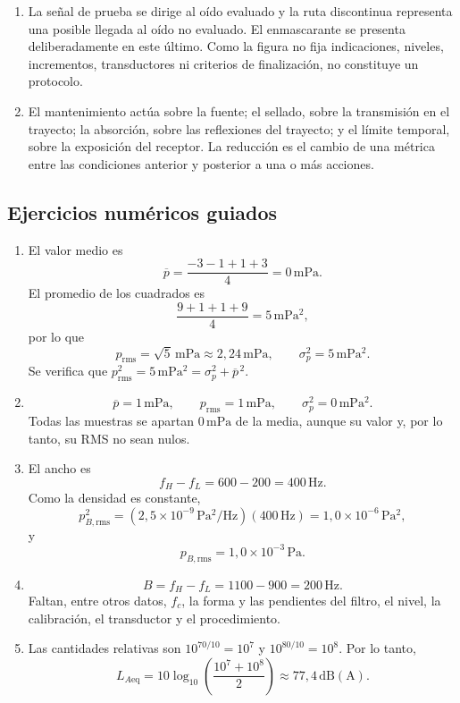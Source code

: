 \begin{enumerate}[label=\textbf{V\arabic*.},leftmargin=*]
    \item La señal de prueba se dirige al oído evaluado y la ruta discontinua
    representa una posible llegada al oído no evaluado. El enmascarante se
    presenta deliberadamente en este último. Como la figura no fija
    indicaciones, niveles, incrementos, transductores ni criterios de
    finalización, no constituye un protocolo.

    \item El mantenimiento actúa sobre la fuente; el sellado, sobre la
    transmisión en el trayecto; la absorción, sobre las reflexiones del
    trayecto; y el límite temporal, sobre la exposición del receptor. La
    reducción es el cambio de una métrica entre las condiciones anterior y
    posterior a una o más acciones.
\end{enumerate}

\subsection*{Ejercicios numéricos guiados}

\begin{enumerate}[label=\textbf{G\arabic*.},leftmargin=*]
    \item El valor medio es
    \[
        \overline p=\frac{-3-1+1+3}{4}=0\,\mathrm{mPa}.
    \]
    El promedio de los cuadrados es
    \[
        \frac{9+1+1+9}{4}=5\,\mathrm{mPa^2},
    \]
    por lo que
    \[
        p_{\mathrm{rms}}=\sqrt{5}\,\mathrm{mPa}
        \approx2{,}24\,\mathrm{mPa},
        \qquad
        \sigma_p^2=5\,\mathrm{mPa^2}.
    \]
    Se verifica que
    \(p_{\mathrm{rms}}^2=5\,\mathrm{mPa^2}
    =\sigma_p^2+\overline p^{\,2}\).

    \item
    \[
        \overline p=1\,\mathrm{mPa},\qquad
        p_{\mathrm{rms}}=1\,\mathrm{mPa},\qquad
        \sigma_p^2=0\,\mathrm{mPa^2}.
    \]
    Todas las muestras se apartan \(0\,\mathrm{mPa}\) de la media, aunque su
    valor y, por lo tanto, su RMS no sean nulos.

    \item El ancho es
    \[
        f_H-f_L=600-200=400\,\mathrm{Hz}.
    \]
    Como la densidad es constante,
    \[
        p_{B,\mathrm{rms}}^2
        =\left(2{,}5\times10^{-9}\,\mathrm{Pa^2/Hz}\right)
        \left(400\,\mathrm{Hz}\right)
        =1{,}0\times10^{-6}\,\mathrm{Pa^2},
    \]
    y
    \[
        p_{B,\mathrm{rms}}
        =1{,}0\times10^{-3}\,\mathrm{Pa}.
    \]

    \item
    \[
        B=f_H-f_L=1100-900=200\,\mathrm{Hz}.
    \]
    Faltan, entre otros datos, \(f_c\), la forma y las pendientes del filtro,
    el nivel, la calibración, el transductor y el procedimiento.

    \item Las cantidades relativas son
    \(10^{70/10}=10^7\) y \(10^{80/10}=10^8\). Por lo tanto,
    \[
        L_{A\mathrm{eq}}
        =10\log_{10}\left(\frac{10^7+10^8}{2}\right)
        \approx77{,}4\,\mathrm{dB(A)}.
    \]
\end{enumerate}

